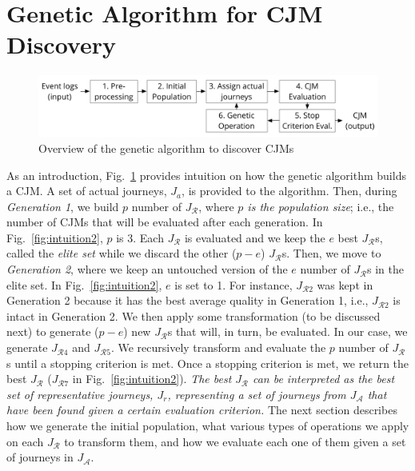 \documentclass[runningheads]{llncs}
\begin{document}
{\section{Genetic Algorithm for CJM Discovery}


\begin{figure}[H]
\centering
\includegraphics[width=0.8\columnwidth]{05_schema/process.pdf}
  \caption{Overview of the genetic algorithm to discover CJMs}
  \label{fig:process}
\end{figure}


As an introduction, Fig.~\ref{fig:process} provides intuition on how the genetic algorithm builds a CJM. A set of actual journeys, $J_{a}$, is provided to the algorithm. Then, during  {\it Generation 1}, we build $p$ number of $J_{\mathcal{R}}$, where {\it $p$ is the population size}; i.e., the number of CJMs that will be evaluated after each generation. In Fig.~\ref{fig:intuition2}, $p$ is 3. Each $J_{\mathcal{R}}$ is evaluated and we keep the $e$ best $J_{\mathcal{R}}$s, called the {\it elite set} while we discard the other ($p-e$) $J_{\mathcal{R}}$s. Then, we move to {\it Generation 2}, where we keep an untouched version of the $e$ number of $J_{\mathcal{R}}$s in the elite set. In Fig.~\ref{fig:intuition2}, $e$ is set to 1. For instance, $J_{\mathcal{R}2}$ was kept in Generation 2 because it has the best average quality in Generation 1, i.e., $J_{\mathcal{R}2}$ is intact in Generation 2. We then apply some transformation (to be discussed next) to generate ($p-e$) new $J_{\mathcal{R}}$s that will, in turn, be evaluated. In our case, we generate $J_{\mathcal{R}4}$ and $J_{\mathcal{R}5}$. We recursively transform and evaluate the $p$ number of $J_{\mathcal{R}}$s until a stopping criterion is met. Once a stopping criterion is met, we return the best $J_{\mathcal{R}}$ ($J_{\mathcal{R}7}$ in Fig.~\ref{fig:intuition2}). { \it The best $J_{\mathcal{R}}$ can be interpreted as the best set of representative journeys, $J_r$, representing a set of journeys from $J_{\mathcal{A}}$ that have been found given a certain evaluation criterion.} The next section describes how we generate the initial population, what various types of operations we apply on each $J_{\mathcal{R}}$ to transform them, and how we evaluate each one of them given a set of journeys in $J_{\mathcal{A}}$. 

}
\end{document}
